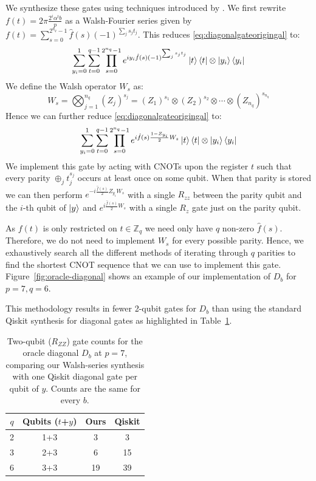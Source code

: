 We synthesize these gates using techniques introduced by \cite{Welch_2014}. We first rewrite $f(t)= 2\pi  \frac{2^i\alpha^t b}{p}$ as a Walsh-Fourier series given by $f(t) = \sum_{s=0}^{2^{n_q}-1} \hat f(s) (-1)^{\sum_{j}s_jt_j}$. This reduces \eqref{eq:diagonalgateorigingal} to:
\begin{equation}
        \sum_{y_i=0}^1\sum_{t=0}^{q-1} \prod_{s=0}^{2^{n_q}-1}
        e^{iy_i \hat f(s)(-1)^{\sum_{j}s_jt_j}}\ket{t}\bra{t} \otimes \ket{y_i}\bra{y_i}
\end{equation}
We define the Walsh operator $W_s$ as:
\begin{equation}
    W_s = \bigotimes_{j=1}^{n_q} (Z_j)^{s_j} = (Z_1)^{s_1}\otimes (Z_2)^{s_2} \otimes \cdots \otimes (Z_{n_q})^{s_{n_q}}
\end{equation}
Hence we can further reduce \eqref{eq:diagonalgateorigingal} to:
\begin{equation}
        \sum_{y_i=0}^1\sum_{t=0}^{q-1} \prod_{s=0}^{2^{n_q}-1}
        e^{i\hat f(s)\frac{1-Z_{y_i}}{2} W_s}\ket{t}\bra{t} \otimes \ket{y_i}\bra{y_i}
\end{equation}
We implement this gate by acting with CNOTs upon the register $t$ such that every parity $\oplus_{j}t_j^{s_j}$ occurs at least once on some qubit. When that parity is stored we can then perform $e^{-i\frac{\hat f(s)}{2} Z_{y_i}W_s}$ with a single $R_{zz}$ between the parity qubit and the $i$-th qubit of $\ket{y}$ and $e^{i\frac{\hat f(s)}{2} W_s}$ with a single $R_z$ gate just on the parity qubit. 

As $f(t)$ is only restricted on $t \in \mathbb{Z}_q$ we need only have $q$ non-zero $\hat f(s)$. Therefore, we do not need to implement $W_s$ for every possible parity. Hence, we exhaustively search all the different methods of iterating through $q$ parities to find the shortest CNOT sequence that we can use to implement this gate. Figure~\ref{fig:oracle-diagonal} shows an example of our implementation of $D_b$ for $p=7, q=6$.

This methodology results in fewer 2-qubit gates for $D_b$ than using the standard Qiskit synthesis for diagonal gates \cite{shende2005synthesis} as highlighted in Table~\ref{tab:diagonal}.
\begin{table}[htbp]
\centering
\setlength{\tabcolsep}{8pt}
\renewcommand{\arraystretch}{1.3}
\begin{tabular}{@{}cccc@{}}
\toprule
$q$ & Qubits ($t$+$y$) & Ours & Qiskit \\
\midrule
2 & 1+3 & 3  & 3  \\
3 & 2+3 & 6  & 15 \\
6 & 3+3 & 19 & 39 \\
\bottomrule
\end{tabular}
\caption{Two-qubit ($R_{ZZ}$) gate counts for the oracle diagonal $D_b$ at $p=7$, comparing our Walsh-series synthesis with one Qiskit diagonal gate per qubit of $y$. Counts are the same for every $b$.}
\label{tab:diagonal}
\end{table}


